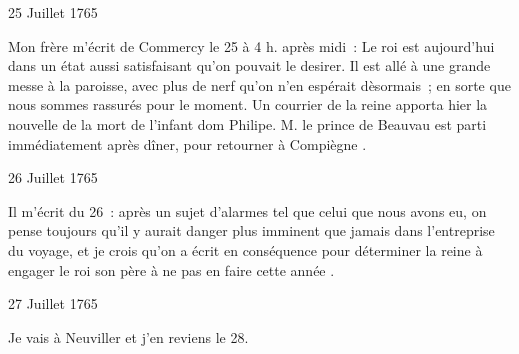                      \begin{diary}{25 Juillet 1765}{}
                        
                        
                           Mon frère m'écrit de
                              Commercy
                           le 25 à
                           4 h. après midi : \og Le roi
                              est aujourd'hui dans un
                              état aussi satisfaisant qu'on pouvait le desirer.
                              Il est allé à une grande messe à la paroisse,
                              avec plus de nerf qu'on n'en espérait dèsormais ; en sorte que nous sommes rassurés
                              pour le moment.
                              Un courrier de la reine
                              apporta hier la nouvelle
                              de la mort de l'infant dom
                                 Philipe.
                                 M. le prince
                                 de Beauvau est parti immédiatement après dîner,
                              pour retourner à Compiègne \fg{}. \bigskip
        
        
                     \end{diary}

                     \begin{diary}{26 Juillet 1765}{}
                        
                         Il m'écrit du 26 : \og après un sujet d'alarmes tel
                              que celui que nous avons eu, on pense toujours
                              qu'il y aurait danger plus imminent que jamais
                              dans l'entreprise du voyage, et je crois qu'on a
                              écrit en conséquence pour déterminer la reine
                              à engager le roi son
                                 père à ne pas en faire cette
                              année \fg{}. \bigskip
        
        
                     \end{diary}

                     \begin{diary}{27 Juillet 1765}{}
                        
                         Je vais à Neuviller et j'en reviens le
                              28. \bigskip
        
        
                     \end{diary}

